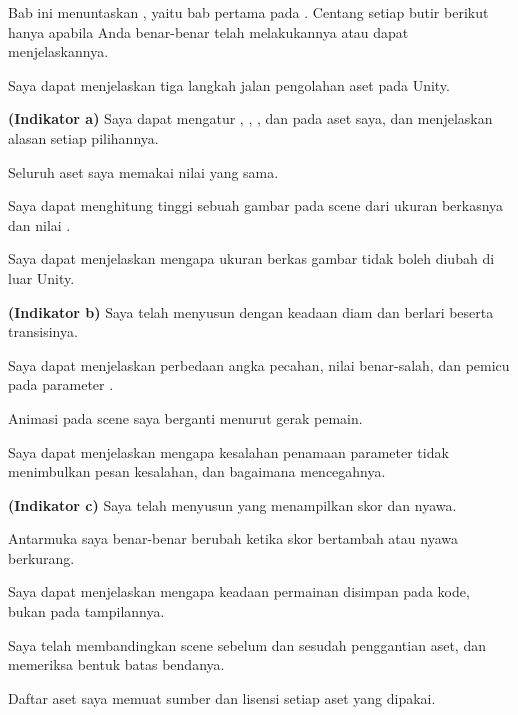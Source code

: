 
Bab ini menuntaskan , yaitu bab pertama pada . Centang
setiap butir berikut hanya apabila Anda benar-benar telah melakukannya atau
dapat menjelaskannya.

\begin{checklistbox}
\begin{checklist}
  \item Saya dapat menjelaskan tiga langkah jalan pengolahan aset pada Unity.
  \item {\bfseries (Indikator a)} Saya dapat mengatur ,
        , , dan
         pada aset saya, dan menjelaskan alasan setiap
        pilihannya.
  \item Seluruh aset saya memakai nilai  yang sama.
  \item Saya dapat menghitung tinggi sebuah gambar pada scene dari ukuran
        berkasnya dan nilai .
  \item Saya dapat menjelaskan mengapa ukuran berkas gambar tidak boleh diubah
        di luar Unity.
  \item {\bfseries (Indikator b)} Saya telah menyusun  dengan
        keadaan diam dan berlari beserta transisinya.
  \item Saya dapat menjelaskan perbedaan angka pecahan, nilai benar-salah, dan
        pemicu pada parameter .
  \item Animasi pada scene saya berganti menurut gerak pemain.
  \item Saya dapat menjelaskan mengapa kesalahan penamaan parameter tidak
        menimbulkan pesan kesalahan, dan bagaimana mencegahnya.
  \item {\bfseries (Indikator c)} Saya telah menyusun  yang
        menampilkan skor dan nyawa.
  \item Antarmuka saya benar-benar berubah ketika skor bertambah atau nyawa
        berkurang.
  \item Saya dapat menjelaskan mengapa keadaan permainan disimpan pada kode,
        bukan pada tampilannya.
  \item Saya telah membandingkan scene sebelum dan sesudah penggantian aset,
        dan memeriksa bentuk batas bendanya.
  \item Daftar aset saya memuat sumber dan lisensi setiap aset yang dipakai.
\end{checklist}
\end{checklistbox}
